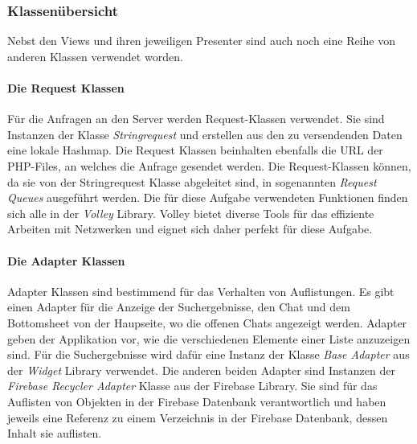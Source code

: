 \documentclass[a4paper,11pt]{report}
\begin{document}
				\subsubsection{Klassenübersicht} %
				Nebst den Views und ihren jeweiligen Presenter sind auch noch eine Reihe von anderen Klassen verwendet worden.
				\paragraph{Die Request Klassen}
				Für die Anfragen an den Server werden Request-Klassen verwendet. Sie sind Instanzen der Klasse \emph{Stringrequest} und erstellen aus den zu versendenden Daten eine lokale Hashmap. Die Request Klassen beinhalten ebenfalls die URL der PHP-Files, an welches die Anfrage gesendet werden. Die Request-Klassen können, da sie von der Stringrequest Klasse abgeleitet sind, in sogenannten \emph{Request Queues}  ausgeführt werden. Die für diese Aufgabe verwendeten Funktionen finden sich alle in der \emph{Volley} Library. Volley bietet diverse Tools für das effiziente Arbeiten mit Netzwerken und eignet sich daher perfekt für diese Aufgabe.\cite{volley}
				\paragraph{Die Adapter Klassen}
				Adapter Klassen sind bestimmend für das Verhalten von Auflistungen. Es gibt einen Adapter für die Anzeige der Suchergebnisse, den Chat und dem Bottomsheet von der Haupseite, wo die offenen Chats angezeigt werden. Adapter geben der Applikation vor, wie die verschiedenen Elemente einer Liste anzuzeigen sind. Für die Suchergebnisse wird dafür eine Instanz der Klasse \emph{Base Adapter} aus der \emph{Widget} Library verwendet. Die anderen beiden Adapter sind Instanzen der \emph{Firebase Recycler Adapter} Klasse aus der Firebase Library. Sie sind für das Auflisten von Objekten in der Firebase Datenbank verantwortlich und haben jeweils eine Referenz zu einem Verzeichnis in der Firebase Datenbank, dessen Inhalt sie auflisten.
\end{document}
